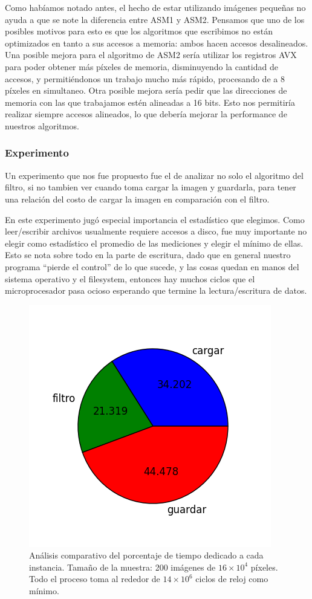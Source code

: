 Como habíamos notado antes, el hecho de estar utilizando imágenes pequeñas no ayuda a que se note la diferencia entre ASM1 y ASM2. Pensamos que uno de los posibles motivos para esto es que los algoritmos que escribimos no están optimizados en tanto a sus accesos a memoria: ambos hacen accesos desalineados. Una posible mejora para el algoritmo de ASM2 sería utilizar los registros AVX para poder obtener más píxeles de memoria, disminuyendo la cantidad de accesos, y permitiéndonos un trabajo mucho más rápido, procesando de a 8 píxeles en simultaneo. Otra posible mejora sería pedir que las direcciones de memoria con las que trabajamos estén alineadas a 16 bits. Esto nos permitiría realizar siempre accesos alineados, lo que debería mejorar la performance de nuestros algoritmos.



\subsubsection*{Experimento}
Un experimento que nos fue propuesto fue el de analizar no solo el algoritmo del filtro, si no tambien ver cuando toma cargar la imagen y guardarla, para tener una relación del costo de cargar la imagen en comparación con el filtro.

En este experimento jugó especial importancia el estadístico que elegimos. Como leer/escribir archivos usualmente requiere accesos a disco, fue muy importante no elegir como estadístico el promedio de las mediciones y elegir el mínimo de ellas. Esto se nota sobre todo en la parte de escritura, dado que en general nuestro programa ``pierde el control'' de lo que sucede, y las cosas quedan en manos del sistema operativo y el filesystem, entonces hay muchos ciclos que el
microprocesador pasa ocioso esperando que termine la lectura/escritura de datos.

\begin{figure}[H] 
	\centering
  \includegraphics[scale=0.7]{images/blur-partes.png}
  \caption{Análisis comparativo del porcentaje de tiempo dedicado a cada instancia. Tamaño de la muestra: 200 imágenes de $16\times 10^4$ píxeles. Todo el proceso toma al rededor de $14 \times 10^6$ ciclos de reloj como mínimo.}
\end{figure}

